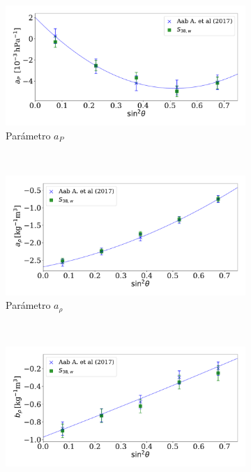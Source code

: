        \begin{figure}[H]
        \centering
           \begin{subfigure}[b]{0.8\textwidth}
           \includegraphics[width=\linewidth]{Graphs/params/ap_ICRC_2019_S38_above_0EeV.pdf}
           \caption{Parámetro $a_P$ }
           \label{fig:ap_2019_S38}
           \end{subfigure}\\%
           \begin{subfigure}[b]{0.8\textwidth}
           \includegraphics[width=\linewidth]{Graphs/params/arho_ICRC_2019_S38_above_0EeV.pdf}
           \caption{Parámetro $a_{\rho}$ }
           \label{fig:arho_2019_S38}
           \end{subfigure}\\%
           \begin{subfigure}[b]{\textwidth}
           \centering
           \includegraphics[width=0.8\linewidth]{Graphs/params/brho_ICRC_2019_S38_above_0EeV.pdf}

\end{subfigure}
\end{figure}
